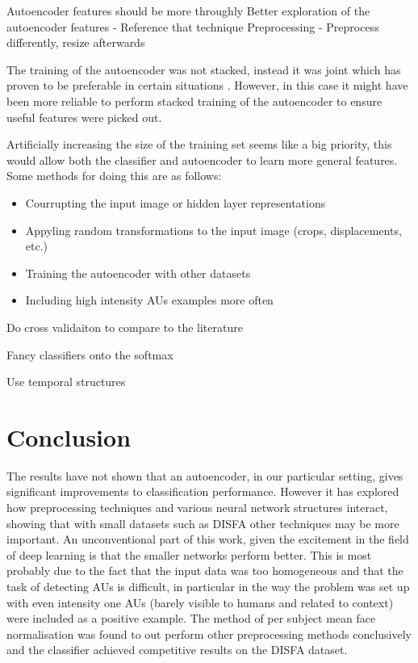     Autoencoder features should be more throughly
    Better exploration of the autoencoder features
      - Reference that technique
    Preprocessing
      - Preprocess differently, resize afterwards


      The training of the autoencoder was not stacked, instead it was joint which
      has proven to be preferable in certain situations \cite{Zhou2014}. However,
      in this case it might have been more reliable to perform stacked training of
      the autoencoder to ensure useful features were picked out.

      Artificially increasing the size of the training set seems like a big
      priority, this would allow both the classifier and autoencoder to learn more
      general features. Some methods for doing this are as follows:

      \begin{itemize}
        \item Courrupting the input image or hidden layer representations
        \item Appyling random transformations to the input image (crops, displacements, etc.)
        \item Training the autoencoder with other datasets
        \item Including high intensity AUs examples more often
      \end{itemize}

    Do cross validaiton to compare to the literature

    Fancy classifiers onto the softmax

    Use temporal structures

\chapter{Conclusion}
  The results have not shown that an autoencoder, in our particular setting,
  gives significant improvements to classification performance. However it has
  explored how preprocessing techniques and various neural network structures
  interact, showing that with small datasets such as DISFA other techniques
  may be more important. An unconventional part of this work, given the
  excitement in the field of deep learning is that the smaller networks
  perform better. This is most probably due to the fact that the input data
  was too homogeneous and that the task of detecting AUs is difficult, in
  particular in the way the problem was set up with even intensity one AUs
  (barely visible to humans and related to context) were included as a
  positive example. The method of per subject mean face normalisation was
  found to out perform other preprocessing methods conclusively and the
  classifier achieved competitive results on the DISFA dataset.
